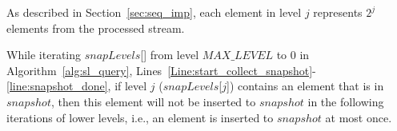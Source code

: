 As described in Section~\ref{sec:seq_imp}, each element in level $j$ represents $2^j$ elements from the processed stream.

\begin{lemma}\label{Lem: all_in_no_dup}
While iterating $\mathit{snapLevels}$[] from level $\mathit{MAX\_LEVEL}$ to $0$ in Algorithm~\ref{alg:sl_query}, Lines~\ref{Line:start_collect_snapshot}-\ref{line:snapshot_done}, if level $j$ ($\mathit{snapLevels}$[$j$]) contains an element that is in $snapshot$, then this element will not be inserted to $snapshot$ in the following iterations of lower levels, i.e., an element is inserted to $snapshot$ at most once.  

\end{lemma}
